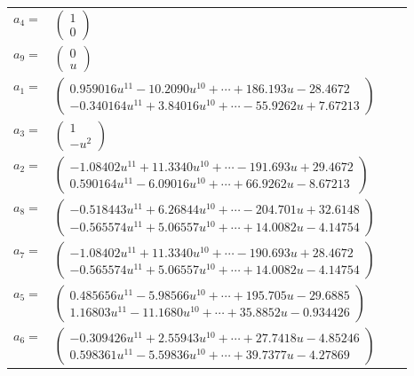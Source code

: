\documentclass[1p]{elsarticle_modified}
\theoremstyle{definition}
\begin{document}
\begin{tabular}{m{7pt} m{180pt} m{7pt} m{180pt} }
\flushright $a_{4}=$&$\begin{pmatrix}1\\0\end{pmatrix}$ \\
\flushright $a_{9}=$&$\begin{pmatrix}0\\u\end{pmatrix}$ \\
\flushright $a_{1}=$&$\begin{pmatrix}0.959016 u^{11}-10.2090 u^{10}+\cdots+186.193 u-28.4672\\-0.340164 u^{11}+3.84016 u^{10}+\cdots-55.9262 u+7.67213\end{pmatrix}$ \\
\flushright $a_{3}=$&$\begin{pmatrix}1\\- u^2\end{pmatrix}$ \\
\flushright $a_{2}=$&$\begin{pmatrix}-1.08402 u^{11}+11.3340 u^{10}+\cdots-191.693 u+29.4672\\0.590164 u^{11}-6.09016 u^{10}+\cdots+66.9262 u-8.67213\end{pmatrix}$ \\
\flushright $a_{8}=$&$\begin{pmatrix}-0.518443 u^{11}+6.26844 u^{10}+\cdots-204.701 u+32.6148\\-0.565574 u^{11}+5.06557 u^{10}+\cdots+14.0082 u-4.14754\end{pmatrix}$ \\
\flushright $a_{7}=$&$\begin{pmatrix}-1.08402 u^{11}+11.3340 u^{10}+\cdots-190.693 u+28.4672\\-0.565574 u^{11}+5.06557 u^{10}+\cdots+14.0082 u-4.14754\end{pmatrix}$ \\
\flushright $a_{5}=$&$\begin{pmatrix}0.485656 u^{11}-5.98566 u^{10}+\cdots+195.705 u-29.6885\\1.16803 u^{11}-11.1680 u^{10}+\cdots+35.8852 u-0.934426\end{pmatrix}$ \\
\flushright $a_{6}=$&$\begin{pmatrix}-0.309426 u^{11}+2.55943 u^{10}+\cdots+27.7418 u-4.85246\\0.598361 u^{11}-5.59836 u^{10}+\cdots+39.7377 u-4.27869\end{pmatrix}$ \\

\end{tabular}
\end{document}
